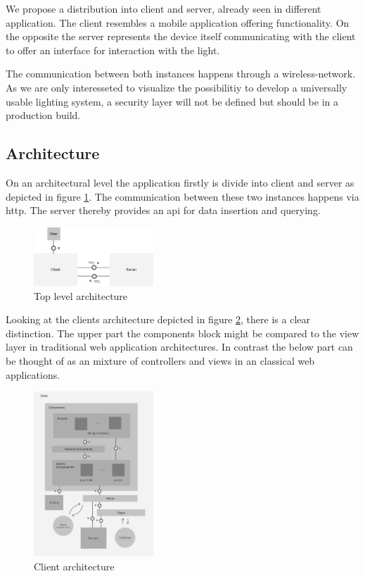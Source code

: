 \documentclass[conference]{IEEEtran}
\begin{document}
We propose a distribution into client and server, already seen in different application. The client resembles a mobile application
offering functionality. On the opposite the server represents the device itself communicating with the client to offer an interface for
interaction with the light.

The communication between both instances happens through a wireless-network. As we are only interesseted to visualize the possibilitiy 
to develop a universally usable lighting system, a security layer will not be defined but should be in a production build. 


\subsection{Architecture}
On an architectural level the application firstly is divide into client and server as depicted in figure \ref{topLevelArch}.
The communication between these two instances happens via http. The server thereby provides an api for data insertion and
querying.

\begin{figure}[H]
    \centering
    \includegraphics[width=0.4\textwidth]{top_level_architecture}
    \caption{Top level architecture}
    \label{topLevelArch}
\end{figure}

Looking at the clients architecture depicted in figure \ref{clientArch}, there is a clear distinction. The upper part the components
block might be compared to the view layer in traditional web application architectures. In contrast the below part can be thought
of as an mixture of controllers and views in an classical web applications.

\begin{figure}[H]
    \centering
    \includegraphics[width=0.4\textwidth]{client_architecture}
    \caption{Client architecture}
    \label{clientArch}
\end{figure}
\end{document}
